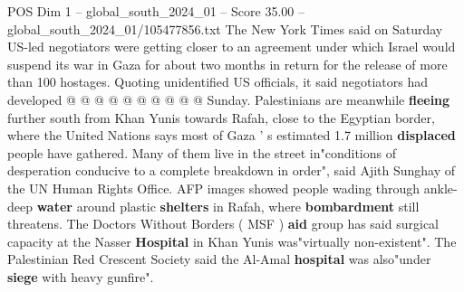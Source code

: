 \begin{textsample}{POS Dim 1 – global\_south\_2024\_01 – Score 35.00 – global\_south\_2024\_01/105477856.txt}
The New York Times said on Saturday US-led negotiators were getting closer to an agreement under which Israel would suspend its war in Gaza for about two months in return for the release of more than 100 hostages.
Quoting unidentified US officials, it said negotiators had developed @ @ @ @ @ @ @ @ @ @ Sunday.
Palestinians are meanwhile \textbf{fleeing} further south from Khan Yunis towards Rafah, close to the Egyptian border, where the United Nations says most of Gaza ' s estimated 1.7 million \textbf{displaced} people have gathered.
Many of them live in the street in"conditions of desperation conducive to a complete breakdown in order", said Ajith Sunghay of the UN Human Rights Office.
AFP images showed people wading through ankle-deep \textbf{water} around plastic \textbf{shelters} in Rafah, where \textbf{bombardment} still threatens.
The Doctors Without Borders ( MSF ) \textbf{aid} group has said surgical capacity at the Nasser \textbf{Hospital} in Khan Yunis was"virtually non-existent".
The Palestinian Red Crescent Society said the Al-Amal \textbf{hospital} was also"under \textbf{siege} with heavy gunfire".

\end{textsample}
